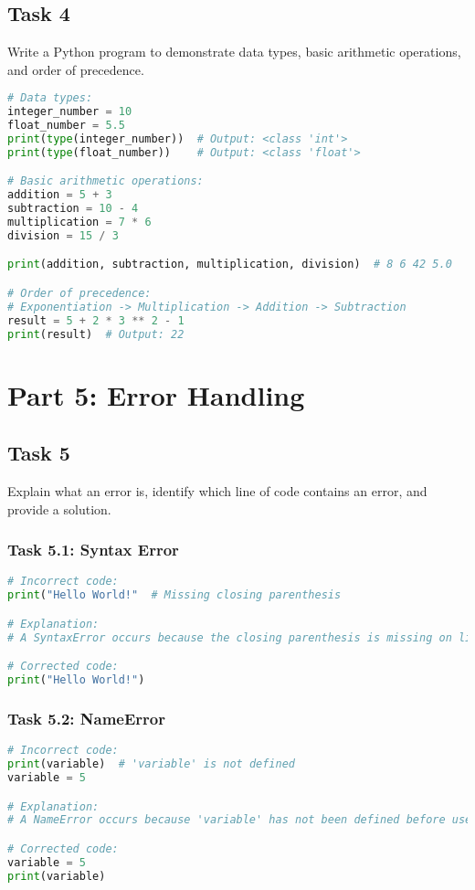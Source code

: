\documentclass[11pt]{article}
\begin{document}
\subsection*{Task 4}
Write a Python program to demonstrate data types, basic arithmetic operations, and order of precedence.

\begin{lstlisting}[language=Python]
# Data types:
integer_number = 10
float_number = 5.5
print(type(integer_number))  # Output: <class 'int'>
print(type(float_number))    # Output: <class 'float'>

# Basic arithmetic operations:
addition = 5 + 3
subtraction = 10 - 4
multiplication = 7 * 6
division = 15 / 3

print(addition, subtraction, multiplication, division)  # 8 6 42 5.0

# Order of precedence:
# Exponentiation -> Multiplication -> Addition -> Subtraction
result = 5 + 2 * 3 ** 2 - 1  
print(result)  # Output: 22
\end{lstlisting}

\section*{Part 5: Error Handling}

\subsection*{Task 5}
Explain what an error is, identify which line of code contains an error, and provide a solution.

\subsubsection*{Task 5.1: Syntax Error}
\begin{lstlisting}[language=Python]
# Incorrect code:
print("Hello World!"  # Missing closing parenthesis

# Explanation:
# A SyntaxError occurs because the closing parenthesis is missing on line 2.

# Corrected code:
print("Hello World!")
\end{lstlisting}

\subsubsection*{Task 5.2: NameError}
\begin{lstlisting}[language=Python]
# Incorrect code:
print(variable)  # 'variable' is not defined
variable = 5

# Explanation:
# A NameError occurs because 'variable' has not been defined before use on line 2.

# Corrected code:
variable = 5
print(variable)
\end{lstlisting}
\end{document}

